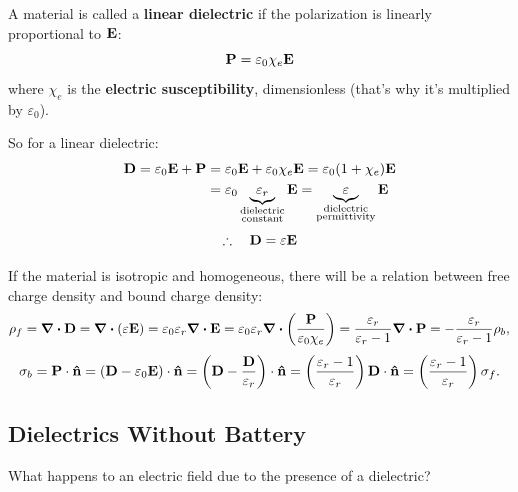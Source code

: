 A material is called a \textbf{linear dielectric} if the polarization is linearly proportional to $\vb{E}$:
\begin{equation}
    \vb{P} = \varepsilon_0 \chi_e \vb{E}
\end{equation}
where $\chi_e$ is the \textbf{electric susceptibility}, dimensionless (that's why it's multiplied by $\varepsilon_0$).

So for a linear dielectric:
\begin{align*}
    \vb{D} = \varepsilon_0 \vb{E} + \vb{P} &= \varepsilon_0 \vb{E} + \varepsilon_0 \chi_e \vb{E} = \varepsilon_0 (1 + \chi_e)\vb{E} \\
    &= \varepsilon_0 \underbrace{\varepsilon_r}_{\substack{\text{dielectric}\\\text{constant}}} \vb{E} = \underbrace{\varepsilon}_{\substack{\text{dielectric}\\\text{permittivity}}} \vb{E}
\end{align*}
\[
\therefore \quad \vb{D} = \varepsilon \vb{E}
\]

If the material is isotropic and homogeneous, there will be a relation between free charge density and bound charge density:
\begin{equation*}
    \rho_f = \div \vb{D} = \div (\varepsilon \vb{E}) = \varepsilon_0 \varepsilon_r \div \vb{E} = \varepsilon_0 \varepsilon_r \div \left(\frac{\vb{P}}{\varepsilon_0 \chi_e}\right) = \frac{\varepsilon_r}{\varepsilon_r - 1}\div \vb{P} = -\frac{\varepsilon_r}{\varepsilon_r - 1}\rho_b,
\end{equation*}
\begin{equation*}
    \sigma_b = \vb{P} \cdot \vu{n} = (\vb{D} - \varepsilon_0 \vb{E}) \cdot \vu{n} = \left(\vb{D} - \frac{\vb{D}}{\varepsilon_r}\right) \cdot \vu{n} = \left(\frac{\varepsilon_r - 1}{\varepsilon_r}\right)\vb{D} \cdot \vu{n} = \left(\frac{\varepsilon_r - 1}{\varepsilon_r}\right)\sigma_f.
\end{equation*}

\subsection{Dielectrics Without Battery}

What happens to an electric field due to the presence of a dielectric?


